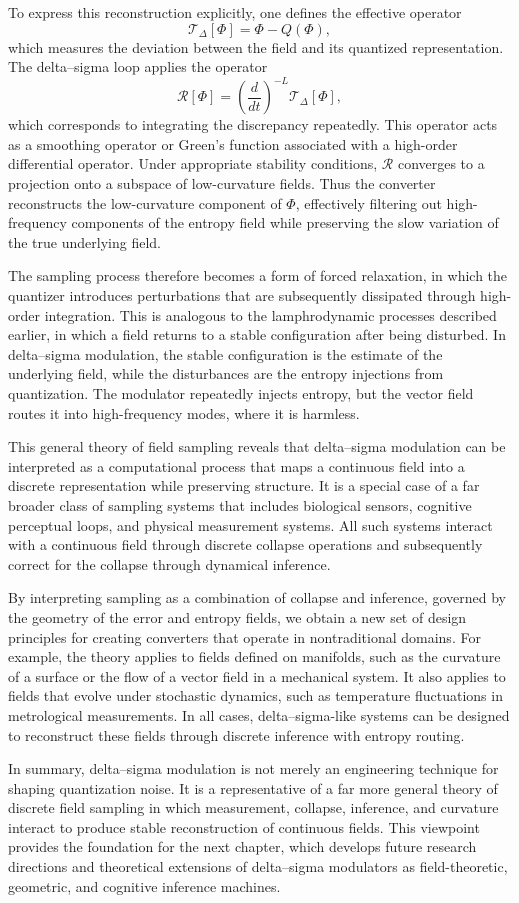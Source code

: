 To express this reconstruction explicitly, one defines the effective operator
\[
\mathcal{T}_{\Delta}[\Phi] = \Phi - Q(\Phi),
\]
which measures the deviation between the field and its quantized representation. The delta–sigma loop applies the operator
\[
\mathcal{R}[\Phi] = \left(\frac{d}{dt}\right)^{-L} \mathcal{T}_{\Delta}[\Phi],
\]
which corresponds to integrating the discrepancy repeatedly. This operator acts as a smoothing operator or Green’s function associated with a high-order differential operator. Under appropriate stability conditions, \(\mathcal{R}\) converges to a projection onto a subspace of low-curvature fields. Thus the converter reconstructs the low-curvature component of \(\Phi\), effectively filtering out high-frequency components of the entropy field while preserving the slow variation of the true underlying field.

The sampling process therefore becomes a form of forced relaxation, in which the quantizer introduces perturbations that are subsequently dissipated through high-order integration. This is analogous to the lamphrodynamic processes described earlier, in which a field returns to a stable configuration after being disturbed. In delta–sigma modulation, the stable configuration is the estimate of the underlying field, while the disturbances are the entropy injections from quantization. The modulator repeatedly injects entropy, but the vector field routes it into high-frequency modes, where it is harmless.

This general theory of field sampling reveals that delta–sigma modulation can be interpreted as a computational process that maps a continuous field into a discrete representation while preserving structure. It is a special case of a far broader class of sampling systems that includes biological sensors, cognitive perceptual loops, and physical measurement systems. All such systems interact with a continuous field through discrete collapse operations and subsequently correct for the collapse through dynamical inference.

By interpreting sampling as a combination of collapse and inference, governed by the geometry of the error and entropy fields, we obtain a new set of design principles for creating converters that operate in nontraditional domains. For example, the theory applies to fields defined on manifolds, such as the curvature of a surface or the flow of a vector field in a mechanical system. It also applies to fields that evolve under stochastic dynamics, such as temperature fluctuations in metrological measurements. In all cases, delta–sigma-like systems can be designed to reconstruct these fields through discrete inference with entropy routing.

In summary, delta–sigma modulation is not merely an engineering technique for shaping quantization noise. It is a representative of a far more general theory of discrete field sampling in which measurement, collapse, inference, and curvature interact to produce stable reconstruction of continuous fields. This viewpoint provides the foundation for the next chapter, which develops future research directions and theoretical extensions of delta–sigma modulators as field-theoretic, geometric, and cognitive inference machines.


